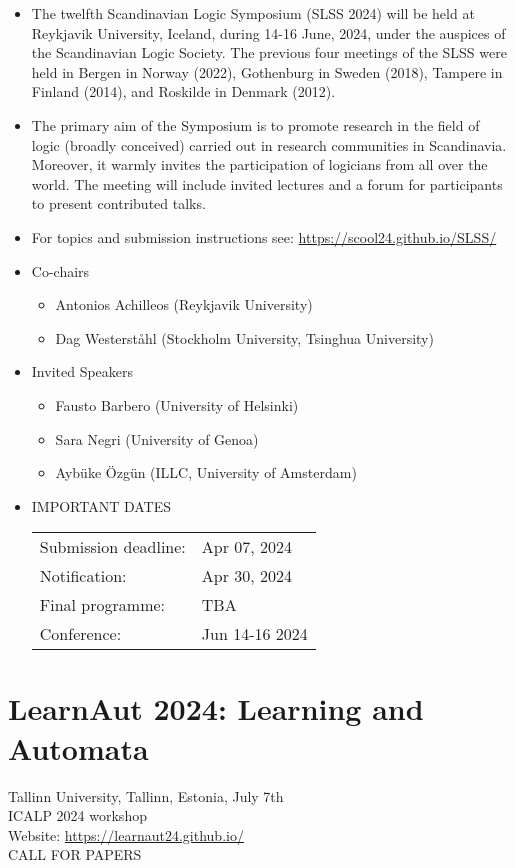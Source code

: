 \documentclass[prodmode,acmtecs]{acmsmall} %
\begin{document}
\begin{itemize}\item  The twelfth Scandinavian Logic Symposium (SLSS 2024) will be held at Reykjavik University, Iceland, during 14-16 June, 2024, under the auspices of the Scandinavian Logic Society. The previous four meetings of the SLSS were held in Bergen in Norway (2022), Gothenburg in Sweden (2018), Tampere in Finland (2014), and Roskilde in Denmark (2012). 
 
\item  The primary aim of the Symposium is to promote research in the field of logic (broadly conceived) carried out in research communities in Scandinavia. Moreover, it warmly invites the participation of logicians from all over the world. The meeting will include invited lectures and a forum for participants to present contributed talks.  
 
\item  For topics and submission instructions see: \href{https://scool24.github.io/SLSS/}{https://scool24.github.io/SLSS/} 
 
\item  Co-chairs 
 
\begin{itemize}\item  Antonios Achilleos (Reykjavik University)
\item  Dag Westerståhl (Stockholm University, Tsinghua University)
\end{itemize} 
\item  Invited Speakers 
 
\begin{itemize}\item  Fausto Barbero (University of Helsinki)
\item  Sara Negri (University of Genoa)
\item  Aybüke Özgün (ILLC, University of Amsterdam)
\end{itemize} 
\item  IMPORTANT DATES 
 
\begin{tabulary}{\linewidth}{LL}Submission deadline:  & Apr 07, 2024 \\
Notification:  & Apr 30, 2024 \\
Final programme:  & TBA \\
Conference:  & Jun 14-16 2024 \\
\end{tabulary}
 
\end{itemize}\section{LearnAut 2024: Learning and Automata}\label{LearnAut2024}  Tallinn University, Tallinn, Estonia, July 7th\\ 
  ICALP 2024 workshop\\ 
  Website: \href{https://learnaut24.github.io/}{https://learnaut24.github.io/}\\ 
CALL FOR PAPERS 
\end{document}
